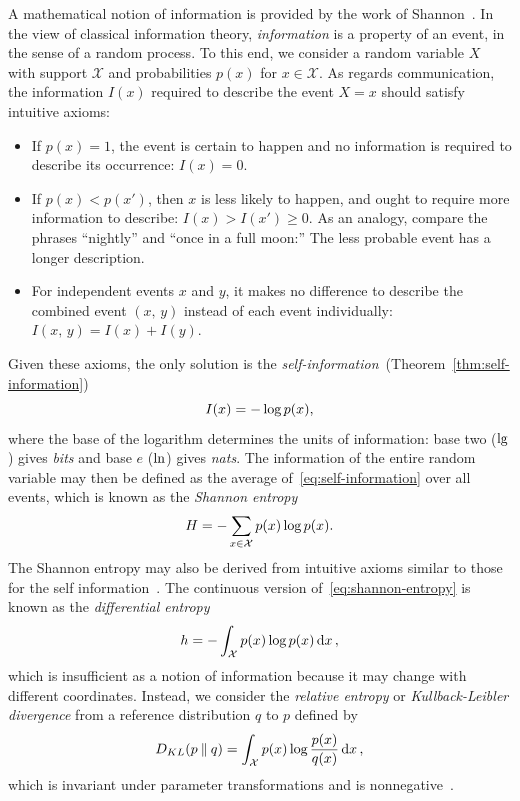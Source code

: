 \documentclass[aps,reprint,floatfix]{revtex4-2}
\renewcommand\mathrm\textnormal%
\theoremstyle{plain}
\theoremstyle{definition}
\renewcommand\geq\geqslant%
\renewcommand\ln{\operatorname{\mathrm{ln}}}
\renewcommand\lg{\operatorname{\mathrm{lg}}}
\renewcommand\log{\operatorname{\mathrm{log}}}
\begin{document}
A mathematical notion of information is provided by the work of
Shannon~\cite{shannon1948mathematical}. In the view of classical information
theory, \emph{information} is a property of an event, in the sense of a random
process. To this end, we consider a random variable $X$ with support
$\mathcal{X}$ and probabilities $p(x)$ for $x \in \mathcal{X}$. As regards
communication, the information $I(x)$ required to describe the event $X = x$
should satisfy intuitive axioms:
\begin{itemize}
  \item If $p(x) = 1$, the event is certain to happen and no information is
    required to describe its occurrence: $I(x) = 0$.
  \item If $p(x) < p(x')$, then $x$ is less likely to happen, and ought to
    require more information to describe: $I(x) > I(x') \geq 0$. As an analogy,
    compare the phrases ``nightly'' and ``once in a full moon:'' The less
    probable event has a longer description.
  \item For independent events $x$ and $y$, it makes no difference to describe
    the combined event $(x,\, y)$ instead of each event individually: $I(x,\, y)
    = I(x) + I(y)$.
\end{itemize}

Given these axioms, the only solution is the
\emph{self-information}~(Theorem~\ref{thm:self-information})
\begin{equation}
  I(x)
  = -\log p(x),
  \label{eq:self-information}
\end{equation}
where the base of the logarithm determines the units of information: base two
($\lg$) gives \emph{bits} and base $e$ ($\ln$) gives \emph{nats}. The
information of the entire random variable may then be defined as the average
of~\eqref{eq:self-information} over all events, which is known as the
\emph{Shannon entropy}
\begin{equation}
  H
  = -\sum_{x \in \mathcal{X}} p(x) \log p(x).
  \label{eq:shannon-entropy}
\end{equation}
The Shannon entropy may also be derived from intuitive axioms similar to those
for the self information~\cite{shannon1948mathematical,jaynes1957information}.
The continuous version of~\eqref{eq:shannon-entropy} is known as the
\emph{differential entropy}
\begin{equation}
  h
  = -\int_{\mathcal{X}} p(x) \log p(x) \dd{x},
  \label{eq:differential-entropy}
\end{equation}
which is insufficient as a notion of information because it may change with
different coordinates. Instead, we consider the \emph{relative entropy} or
\emph{Kullback-Leibler divergence} from a reference distribution $q$ to $p$
defined by
\begin{equation}
  D_{KL}(p \mathbin{\|} q)
  = \int_{\mathcal{X}} p(x) \log \frac{p(x)}{q(x)} \dd{x},
  \label{eq:kl-divergence}
\end{equation}
which is invariant under parameter transformations and
is nonnegative~\cite[p.~243]{cover}.
\end{document}
